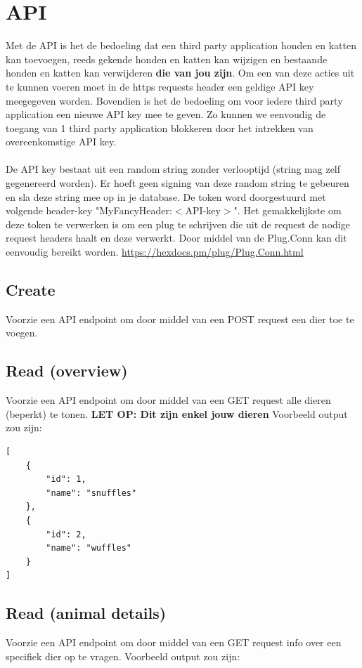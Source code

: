 \documentclass{article}
\begin{document}
\section{API}
Met de API is het de bedoeling dat een third party application honden en katten kan toevoegen, reeds gekende honden en katten kan wijzigen en bestaande honden en katten kan verwijderen \textbf{die van jou zijn}. Om een van deze acties uit te kunnen voeren moet in de https requests header een geldige API key meegegeven worden. Bovendien is het de bedoeling om voor iedere third party application een nieuwe API key mee te geven. Zo kunnen we eenvoudig de toegang van 1 third party application blokkeren door het intrekken van overeenkomstige API key.
\\
\\
De API key bestaat uit een random string zonder verlooptijd (string mag zelf gegenereerd worden). Er hoeft geen signing van deze random string te gebeuren en sla deze string mee op in je database. De token word doorgestuurd met volgende header-key "MyFancyHeader:$<$API-key$>$".
Het gemakkelijkste om deze token te verwerken is om een plug te schrijven die uit de request de nodige request headers haalt en deze verwerkt. Door middel van de Plug.Conn kan dit eenvoudig bereikt worden. \url{https://hexdocs.pm/plug/Plug.Conn.html}

\subsection{Create}
Voorzie een API endpoint om door middel van een POST request een dier toe te voegen.

\subsection{Read (overview)}
Voorzie een API endpoint om door middel van een GET request alle dieren (beperkt) te tonen. \textbf{LET OP: Dit zijn enkel jouw dieren} Voorbeeld output zou zijn:

\begin{verbatim}
[
    {
        "id": 1,
        "name": "snuffles"
    },
    {
        "id": 2,
        "name": "wuffles"
    }
]
\end{verbatim}

\subsection{Read (animal details)}
Voorzie een API endpoint om door middel van een GET request info over een specifiek dier op te vragen. Voorbeeld output zou zijn:
\end{document}
